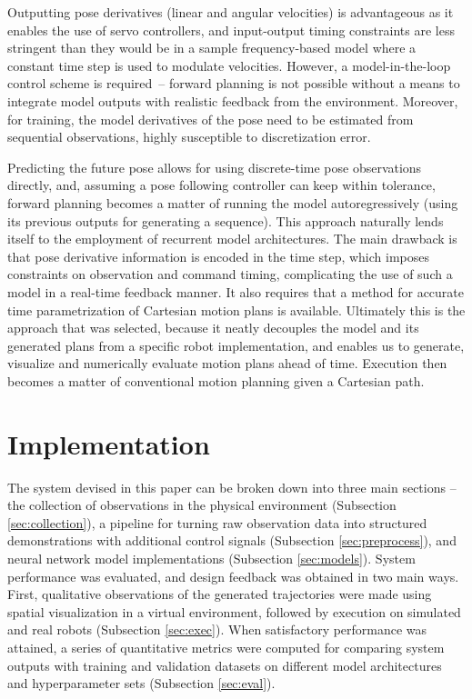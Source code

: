 \documentclass{article}
\begin{document}
Outputting pose derivatives (linear and angular velocities) is advantageous as it enables the use of servo controllers, and input-output timing constraints are less stringent than they would be in a sample frequency-based model where a constant time step is used to modulate velocities. However, a model-in-the-loop control scheme is required~-- forward planning is not possible without a means to integrate model outputs with realistic feedback from the environment. Moreover, for training, the model derivatives of the pose need to be estimated from sequential observations, highly susceptible to discretization error. 

Predicting the future pose allows for using discrete-time pose observations directly, and, assuming a pose following controller can keep within tolerance, forward planning becomes a matter of running the model autoregressively (using its previous outputs for generating a sequence). This approach naturally lends itself to the employment of recurrent model architectures. The main drawback is that pose derivative information is encoded in the time step, which imposes constraints on observation and command timing, complicating the use of such a model in a real-time feedback manner. It also requires that a method for accurate time parametrization of Cartesian motion plans is available. Ultimately this is the approach that was selected, because it neatly decouples the model and its generated plans from a specific robot implementation, and enables us to generate, visualize and numerically evaluate motion plans ahead of time. Execution then becomes a matter of conventional motion planning given a Cartesian path.


\section{Implementation}
\label{sec:materials}

The system devised in this paper can be broken down into three main sections -- the collection of observations in the physical environment (Subsection \ref{sec:collection}), a pipeline for turning raw observation data into structured demonstrations with additional control signals (Subsection \ref{sec:preprocess}), and neural network model implementations (Subsection \ref{sec:models}). System performance was evaluated, and design feedback was obtained in two main ways. First, qualitative observations of the generated trajectories were made using spatial visualization in a virtual environment, followed by execution on simulated and real robots (Subsection \ref{sec:exec}). When satisfactory performance was attained, a series of quantitative metrics were computed for comparing system outputs with training and validation datasets on different model architectures and hyperparameter sets (Subsection \ref{sec:eval}).
\end{document}
